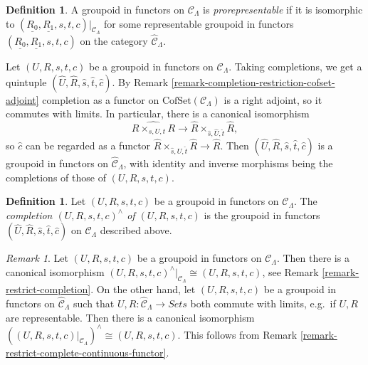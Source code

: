 \documentclass{stacks-project}
\theoremstyle{plain}
\theoremstyle{definition}
\newtheorem{definition}[subsection]{Definition}
\theoremstyle{remark}
\newtheorem{remark}[subsection]{Remark}
\numberwithin{equation}{subsection}
\begin{document}
\begin{definition}
\label{definition-prorepresentable-groupoid-in-functors}
A groupoid in functors on $\mathcal{C}_\Lambda$ is {\it prorepresentable}
if it is isomorphic to
$(\underline{R_0}, \underline{R_1}, s, t, c)|_{\mathcal{C}_\Lambda}$
for some representable groupoid in functors
$(\underline{R_0}, \underline{R_1}, s, t, c)$ on the category
$\widehat{\mathcal{C}}_\Lambda$.
\end{definition}

\noindent
Let $(U, R, s, t, c)$ be a groupoid in functors on $\mathcal{C}_\Lambda$.
Taking completions, we get a quintuple
$(\widehat{U}, \widehat{R}, \widehat{s}, \widehat{t}, \widehat{c})$. By
Remark \ref{remark-completion-restriction-cofset-adjoint}
completion as a functor on $\text{CofSet}(\mathcal{C}_\Lambda)$ is a right
adjoint, so it commutes with limits. In particular, there is a canonical
isomorphism
$$
\widehat{R \times_{s, U, t} R}
\longrightarrow
\widehat{R} \times_{\widehat{s}, \widehat{U}, \widehat{t}} \widehat{R},
$$
so $\widehat{c}$ can be regarded as a functor
$\widehat{R} \times_{\widehat{s}, \widehat{U}, \widehat{t}} \widehat{R} \to
\widehat{R}$. Then
$(\widehat{U}, \widehat{R}, \widehat{s}, \widehat{t}, \widehat{c})$
is a groupoid in functors on $\widehat{\mathcal{C}}_\Lambda$, with
identity and inverse morphisms being the completions of those of
$(U, R, s, t, c)$.

\begin{definition}
\label{definition-completion-groupoid-in-functors}
Let $(U, R, s, t, c)$ be a groupoid in functors on $\mathcal{C}_\Lambda$.
The {\it completion $(U, R, s, t, c)^{\wedge}$ of $(U, R, s, t, c)$} is the
groupoid in functors
$(\widehat{U}, \widehat{R}, \widehat{s}, \widehat{t}, \widehat{c})$
on $\widehat{\mathcal{C}}_\Lambda$ described above.
\end{definition}

\begin{remark}
\label{remark-groupoid-in-functors-complete-restrict}
Let $(U, R, s, t, c)$ be a groupoid in functors on $\mathcal{C}_\Lambda$.
Then there is a canonical isomorphism
$(U, R, s, t, c)^{\wedge}|_{\mathcal{C}_\Lambda} \cong (U, R, s, t, c)$, see
Remark \ref{remark-restrict-completion}.
On the other hand, let $(U, R, s, t, c)$ be a groupoid in functors on
$\widehat{\mathcal{C}}_\Lambda$ such that
$U, R : \widehat{\mathcal{C}}_\Lambda \to \textit{Sets}$
both commute with limits, e.g.\ if $U, R$ are representable.
Then there is a canonical isomorphism
$((U, R, s, t, c)|_{\mathcal{C}_\Lambda})^{\wedge} \cong (U, R, s, t, c)$.
This follows from
Remark \ref{remark-restrict-complete-continuous-functor}.
\end{remark}
\end{document}
